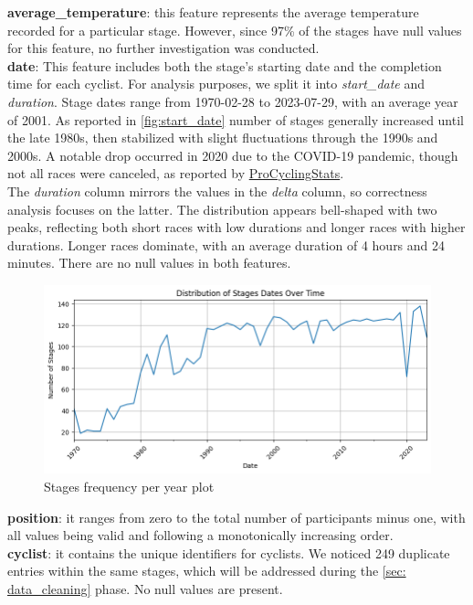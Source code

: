 \noindent \textbf{average\_temperature}: this feature represents the average temperature recorded for a particular stage. However, since 97\% of the stages have null values for this feature, no further investigation was conducted.\\

\noindent \textbf{date}: This feature includes both the stage's starting date and the completion time for each cyclist. For analysis purposes, we split it into \textit{start\_date} and \textit{duration}. Stage dates range from 1970-02-28 to 2023-07-29, with an average year of 2001. As reported in \autoref{fig:start_date} number of stages generally increased until the late 1980s, then stabilized with slight fluctuations through the 1990s and 2000s. A notable drop occurred in 2020 due to the COVID-19 pandemic, though not all races were canceled, as reported by \href{https://www.procyclingstats.com/statistics.php}{ProCyclingStats}. \\ The \textit{duration} column mirrors the values in the \textit{delta} column, so correctness analysis focuses on the latter. The distribution appears bell-shaped with two peaks, reflecting both short races with low durations and longer races with higher durations. Longer races dominate, with an average duration of 4 hours and 24 minutes. There are no null values in both features.\\

\begin{figure}[H]
    \centering
    \includegraphics[width=0.5\linewidth]{images//DU/start_date_plot.png}
    \caption{\small Stages frequency per year plot}
    \label{fig:start_date}
\end{figure}


\noindent \textbf{position}: it ranges from zero to the total number of participants minus one, with all values being valid and following a monotonically increasing order.\\

\noindent \textbf{cyclist}: it contains the unique identifiers for cyclists. We noticed 249 duplicate entries within the same stages, which will be addressed during the \autoref{sec: data_cleaning} phase. No null values are present.\\

